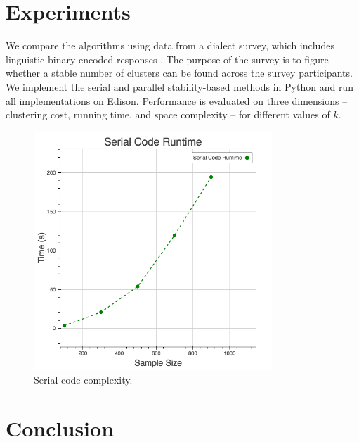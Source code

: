 \documentclass[10pt,twocolumn,letterpaper]{article}
\begin{document}
\section{Experiments} \label{section:experiments}

We compare the algorithms using data from a dialect survey, which includes linguistic binary encoded responses \cite{vaux2003}. The purpose of the survey is to figure whether a stable number of clusters can be found across the survey participants. We implement the serial and parallel stability-based methods in Python and run all implementations on Edison. Performance is evaluated on three dimensions -- clustering cost, running time, and space complexity -- for different values of $k$.


\begin{figure}[htbp] 
   \centering
   \includegraphics[width=0.8\textwidth]{./figure/serial.png}
   \caption{Serial code complexity.}
   \label{fig:serial}
\end{figure}


\section{Conclusion} \label{section:Con}



{\small


}
\end{document}
